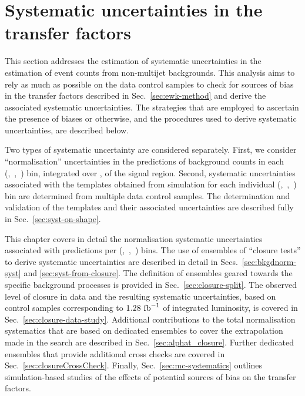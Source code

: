 \section{Systematic uncertainties in the transfer factors}
\label{sec:systematics}

This section addresses the estimation of systematic uncertainties in
the estimation of event counts from non-multijet backgrounds. This
analysis aims to rely as much as possible on the data control samples
to check for sources of bias in the transfer factors described in
Sec.~\ref{sec:ewk-method} and derive the associated systematic
uncertainties. The strategies that are employed to ascertain the
presence of biases or otherwise, and the procedures used to derive
systematic uncertainties, are described below.

Two types of systematic uncertainty are considered separately. First,
we consider ``normalisation'' uncertainties in the predictions of
background counts in each (\njet,~\nb,~\scalht) bin, integrated over
\mht, of the signal region. Second, systematic uncertainties
associated with the \mht templates obtained from simulation for each
individual (\njet,~\nb,~\scalht) bin are determined from multiple data
control samples. The determination and validation of the \mht
templates and their associated uncertainties are described fully in
Sec.~\ref{sec:syst-on-shape}.

This chapter covers in detail the normalisation systematic
uncertainties associated with predictions per (\njet,~\nb,~\scalht)
bins. The use of ensembles of ``closure tests'' to derive systematic
uncertainties are described in detail in Secs.~\ref{sec:bkgdnorm-syst}
and \ref{sec:syst-from-closure}. The definition of ensembles geared
towards the specific background processes is provided in
Sec.~\ref{sec:closure-split}. The observed level of closure in data
and the resulting systematic uncertainties, based on control samples
corresponding to $1.28~\text{fb}^{-1}$ of integrated luminosity, is covered in
Sec.~\ref{sec:closure-data-study}. Additional contributions to the
total normalisation systematics that are based on dedicated ensembles
to cover the \alphat extrapolation made in the search are described in
Sec.~\ref{sec:alphat_closure}. Further dedicated ensembles that
provide additional cross checks are covered in
Sec.~\ref{sec:closureCrossCheck}. Finally,
Sec.~\ref{sec:mc-systematics} outlines simulation-based studies of the
effects of potential sources of bias on the transfer factors.

